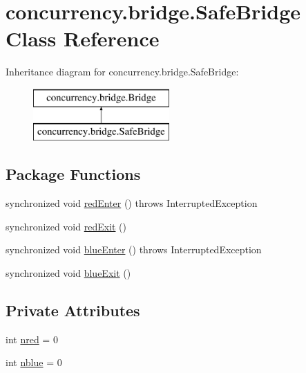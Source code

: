 \hypertarget{classconcurrency_1_1bridge_1_1_safe_bridge}{}\section{concurrency.\+bridge.\+Safe\+Bridge Class Reference}
\label{classconcurrency_1_1bridge_1_1_safe_bridge}
Inheritance diagram for concurrency.\+bridge.\+Safe\+Bridge\+:\begin{figure}[H]
\begin{center}
\leavevmode
\includegraphics[height=2.000000cm]{classconcurrency_1_1bridge_1_1_safe_bridge}
\end{center}
\end{figure}
\subsection*{Package Functions}
\begin{DoxyCompactItemize}
\item 
synchronized void \mbox{\hyperlink{classconcurrency_1_1bridge_1_1_safe_bridge_a291e117cad1bc432528de5622a0f77f3}{red\+Enter}} ()  throws Interrupted\+Exception 
\item 
synchronized void \mbox{\hyperlink{classconcurrency_1_1bridge_1_1_safe_bridge_a55f78f015ba654a529d3a4cf71e49261}{red\+Exit}} ()
\item 
synchronized void \mbox{\hyperlink{classconcurrency_1_1bridge_1_1_safe_bridge_a28cc98eb975d533c2c51c995b7f7362a}{blue\+Enter}} ()  throws Interrupted\+Exception 
\item 
synchronized void \mbox{\hyperlink{classconcurrency_1_1bridge_1_1_safe_bridge_aaabab0c6e58580d01fd01fd6ec242085}{blue\+Exit}} ()
\end{DoxyCompactItemize}
\subsection*{Private Attributes}
\begin{DoxyCompactItemize}
\item 
int \mbox{\hyperlink{classconcurrency_1_1bridge_1_1_safe_bridge_aa2abb2203b25978e240bb355a84ae5fc}{nred}} = 0
\item 
int \mbox{\hyperlink{classconcurrency_1_1bridge_1_1_safe_bridge_ac3f25c616210ab4cc7af4882a0145ae6}{nblue}} = 0
\end{DoxyCompactItemize}


